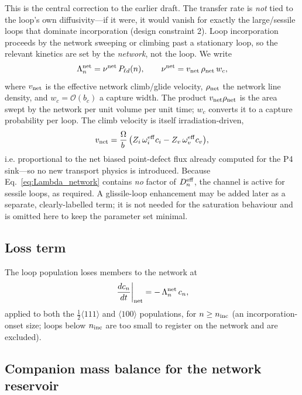\documentclass[11pt,a4paper]{article}
\begin{document}
This is the central correction to the earlier draft.  The transfer rate is
\emph{not} tied to the loop's own diffusivity---if it were, it would vanish for
exactly the large/sessile loops that dominate incorporation (design constraint
2).  Loop incorporation proceeds by the network sweeping or climbing past a
stationary loop, so the relevant kinetics are set by the \emph{network}, not
the loop.  We write
\begin{equation}
  \Lambda_n^{\rm net}=\nu^{\rm net}\,P_{\ell d}(n),\qquad
  \nu^{\rm net}=v_{\rm net}\,\rho_{\rm net}\,w_c,
  \label{eq:Lambda_network}
\end{equation}
where $v_{\rm net}$ is the effective network climb/glide velocity, $\rho_{\rm
net}$ the network line density, and $w_c=\mathcal{O}(b_c)$ a capture width.
The product $v_{\rm net}\rho_{\rm net}$ is the area swept by the network per
unit volume per unit time; $w_c$ converts it to a capture probability per loop.
The climb velocity is itself irradiation-driven,
\begin{equation}
  v_{\rm net}=\frac{\Omega}{b\,}\,
  \bigl(Z_i\,\omega_i^{\rm eff}c_i-Z_v\,\omega_v^{\rm eff}c_v\bigr),
  \label{eq:vnet}
\end{equation}
i.e. proportional to the net biased point-defect flux already computed for the
P4 sink---so no new transport physics is introduced.  Because
Eq.~\eqref{eq:Lambda_network} contains \emph{no} factor of $D_n^{\rm eff}$, the
channel is active for sessile loops, as required.  A glissile-loop enhancement
may be added later as a separate, clearly-labelled term; it is not needed for
the saturation behaviour and is omitted here to keep the parameter set minimal.

\subsection*{Loss term}

The loop population loses members to the network at
\begin{equation}
  \left.\frac{dc_n}{dt}\right|_{\rm net}=-\,\Lambda_n^{\rm net}\,c_n,
  \label{eq:loop_network_loss}
\end{equation}
applied to both the $\tfrac12\langle111\rangle$ and $\langle100\rangle$
populations, for $n\ge n_{\rm inc}$ (an incorporation-onset size; loops below
$n_{\rm inc}$ are too small to register on the network and are excluded).

\subsection*{Companion mass balance for the network reservoir}
\end{document}
